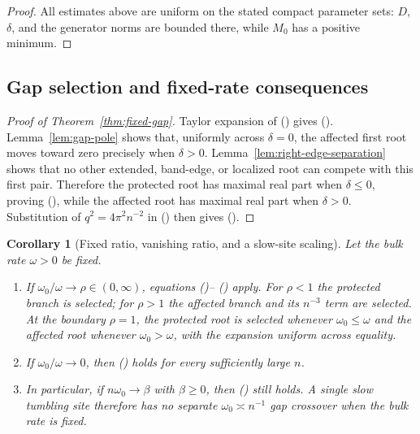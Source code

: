 \documentclass[twoside,10pt]{article}
\numberwithin{equation}{section}
\theoremstyle{slbody}
\newtheorem{corollary}[theorem]{Corollary}
\theoremstyle{definition}
\theoremstyle{remark}
\renewcommand{\eqref}[1]{%
  \textup{{\normalfont(\oldstylenums{\ref{#1}}}\normalfont)}}
\begin{document}
\begin{proof}
All estimates above are uniform on the stated compact parameter sets:
$D$, $\delta$, and the generator norms are bounded there, while $M_0$
has a positive minimum.
\end{proof}

\subsection{Gap selection and fixed-rate consequences}

\begin{proof}[Proof of Theorem~\ref{thm:fixed-gap}]
Taylor expansion of \eqref{eq:hom-gap} gives
\eqref{eq:hom-gap-expansion}.  Lemma~\ref{lem:gap-pole} shows
that, uniformly across $\delta=0$, the affected first root moves toward
zero precisely when $\delta>0$.
Lemma~\ref{lem:right-edge-separation} shows that no other
extended, band-edge, or localized root can compete with this first
pair.  Therefore the protected root has maximal real part when
$\delta\le0$, proving \eqref{eq:slow-defect-gap}, while the affected
root has maximal real part when $\delta>0$.  Substitution of
$q^2=4\pi^2n^{-2}$ in
\eqref{eq:affected-gap-shift} then gives \eqref{eq:fast-defect-gap}.
\end{proof}

\begin{corollary}[Fixed ratio, vanishing ratio, and a slow-site scaling]
\label{cor:fixed-rate-regimes}
Let the bulk rate $\omega>0$ be fixed.
\begin{enumerate}
\item If $\omega_0/\omega\to\rho\in(0,\infty)$, equations
  \eqref{eq:slow-defect-gap}--\eqref{eq:hom-gap-expansion} apply.  For
  $\rho<1$ the protected branch is selected; for
  $\rho>1$ the affected branch and its $n^{-3}$ term are selected.  At
  the boundary $\rho=1$, the protected root is selected whenever
  $\omega_0\le\omega$ and the affected root whenever
  $\omega_0>\omega$, with the expansion uniform across equality.
\item If $\omega_0/\omega\to0$, then \eqref{eq:slow-defect-gap} holds
  for every sufficiently large $n$.
\item In particular, if $n\omega_0\to\beta$ with $\beta\ge0$, then
  \eqref{eq:slow-defect-gap} still holds.  A single slow tumbling site
  therefore has no
  separate $\omega_0\asymp n^{-1}$ gap crossover when the bulk rate is
  fixed.
\end{enumerate}
\end{corollary}
\end{document}
